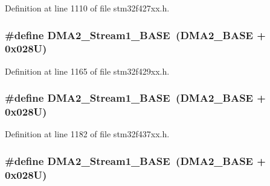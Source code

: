Definition at line 1110 of file stm32f427xx.\+h.

\subsubsection[{\texorpdfstring{D\+M\+A2\+\_\+\+Stream1\+\_\+\+B\+A\+SE}{DMA2_Stream1_BASE}}]{\setlength{\rightskip}{0pt plus 5cm}\#define D\+M\+A2\+\_\+\+Stream1\+\_\+\+B\+A\+SE~({\bf D\+M\+A2\+\_\+\+B\+A\+SE} + 0x028\+U)}\hypertarget{group___peripheral__memory__map_ga35512bdc3f5e9df4557c2fbe7935d0b1}{}\label{group___peripheral__memory__map_ga35512bdc3f5e9df4557c2fbe7935d0b1}


Definition at line 1165 of file stm32f429xx.\+h.

\subsubsection[{\texorpdfstring{D\+M\+A2\+\_\+\+Stream1\+\_\+\+B\+A\+SE}{DMA2_Stream1_BASE}}]{\setlength{\rightskip}{0pt plus 5cm}\#define D\+M\+A2\+\_\+\+Stream1\+\_\+\+B\+A\+SE~({\bf D\+M\+A2\+\_\+\+B\+A\+SE} + 0x028\+U)}\hypertarget{group___peripheral__memory__map_ga35512bdc3f5e9df4557c2fbe7935d0b1}{}\label{group___peripheral__memory__map_ga35512bdc3f5e9df4557c2fbe7935d0b1}


Definition at line 1182 of file stm32f437xx.\+h.

\subsubsection[{\texorpdfstring{D\+M\+A2\+\_\+\+Stream1\+\_\+\+B\+A\+SE}{DMA2_Stream1_BASE}}]{\setlength{\rightskip}{0pt plus 5cm}\#define D\+M\+A2\+\_\+\+Stream1\+\_\+\+B\+A\+SE~({\bf D\+M\+A2\+\_\+\+B\+A\+SE} + 0x028\+U)}\hypertarget{group___peripheral__memory__map_ga35512bdc3f5e9df4557c2fbe7935d0b1}{}\label{group___peripheral__memory__map_ga35512bdc3f5e9df4557c2fbe7935d0b1}


